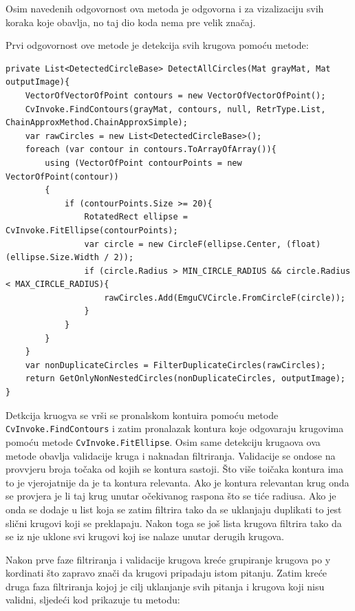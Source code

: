 \documentclass{foi}
\begin{document}
Osim navedenih odgovornost ova metoda je odgovorna i za vizalizaciju svih koraka koje obavlja, no taj dio koda nema pre velik značaj.

Prvi odgovornost ove metode je detekcija svih krugova pomoću metode:

\begin{lstlisting}[caption={Metoda za detektciju svih krugova na slici}]
private List<DetectedCircleBase> DetectAllCircles(Mat grayMat, Mat outputImage){
    VectorOfVectorOfPoint contours = new VectorOfVectorOfPoint();
    CvInvoke.FindContours(grayMat, contours, null, RetrType.List, ChainApproxMethod.ChainApproxSimple);
    var rawCircles = new List<DetectedCircleBase>();
    foreach (var contour in contours.ToArrayOfArray()){
        using (VectorOfPoint contourPoints = new VectorOfPoint(contour))
        {
            if (contourPoints.Size >= 20){
                RotatedRect ellipse = CvInvoke.FitEllipse(contourPoints);
                var circle = new CircleF(ellipse.Center, (float)(ellipse.Size.Width / 2));
                if (circle.Radius > MIN_CIRCLE_RADIUS && circle.Radius < MAX_CIRCLE_RADIUS){
                    rawCircles.Add(EmguCVCircle.FromCircleF(circle));
                }
            }
        }
    }
    var nonDuplicateCircles = FilterDuplicateCircles(rawCircles);
    return GetOnlyNonNestedCircles(nonDuplicateCircles, outputImage);
}
\end{lstlisting}

Detkcija kruogva se vrši se pronalskom kontuira pomoću metode \texttt{CvInvoke.FindContours} i zatim pronalazak kontura koje odgovaraju krugovima pomoću metode \texttt{CvInvoke.FitEllipse}. Osim same detekciju krugaova ova metode obavlja validacije kruga i naknadan filtriranja. Validacije se ondose na provvjeru broja točaka od kojih se kontura sastoji. Što više toičaka kontura ima to je vjerojatnije da je ta kontura relevanta. Ako je kontura relevantan krug onda se provjera je li taj krug unutar očekivanog raspona što se tiće radiusa. Ako je onda se dodaje u list koja se zatim filtrira tako da se uklanjaju duplikati to jest slični krugovi koji se preklapaju. Nakon toga se još lista krugova filtrira tako da se iz nje uklone svi krugovi koj ise nalaze unutar derugih krugova.

\pagebreak
Nakon prve faze filtriranja i validacije krugova kreće grupiranje krugova po y kordinati što zapravo znači da krugovi pripadaju istom pitanju. Zatim kreće druga faza filtriranja kojoj je cilj uklanjanje svih pitanja i krugova koji nisu validni, sljedeći kod prikazuje tu metodu: 
\end{document}
